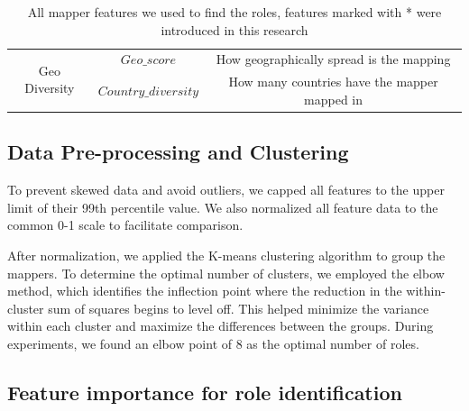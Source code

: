\documentclass[manuscript,screen,review]{acmart}
\begin{document}
\begin{table}[h!]
\begin{tabular}{ccc}
\multirow{2}{*}{Geo Diversity}     & $Geo\_score$                & How geographically spread is the mapping                                                          \\ \cline{2-3} 
                                   & $Country\_diversity$        & How many countries have the mapper mapped in                                                              \\ \hline
\end{tabular}
\caption{All mapper features we used to find the roles, features marked with * were introduced in this research}
\label{mapper-feature}
\end{table}

\subsection{Data Pre-processing and Clustering}

To prevent skewed data and avoid outliers, we capped all features to the upper limit of their 99th percentile value. We also normalized all feature data to the common 0-1 scale to facilitate comparison.

After normalization, we applied the K-means clustering algorithm to group the mappers. To determine the optimal number of clusters, we employed the elbow method, which identifies the inflection point where the reduction in the within-cluster sum of squares begins to level off. This helped minimize the variance within each cluster and maximize the differences between the groups. During experiments, we found an elbow point of 8 as the optimal number of roles.

\subsection{Feature importance for role identification}
\end{document}
